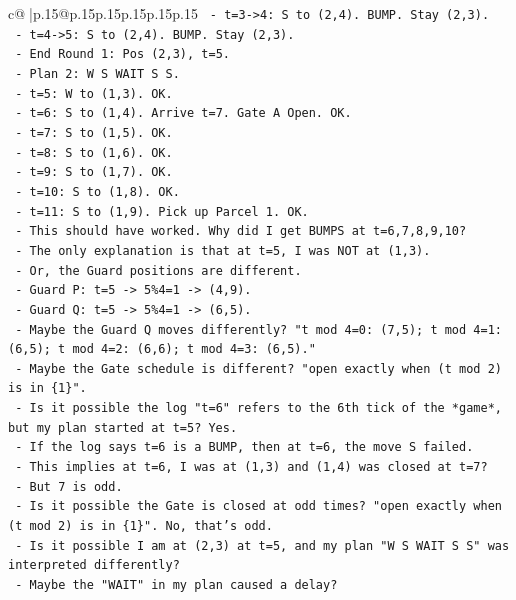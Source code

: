 \documentclass{article}
\begin{document}
{\begin{supertabular}{c@{$\;$}|p{.15\linewidth}@{}p{.15\linewidth}p{.15\linewidth}p{.15\linewidth}p{.15\linewidth}p{.15\linewidth}}
{{{\texttt{  {-} t=3{-}>4: S to (2,4). BUMP. Stay (2,3).} \\
\texttt{  {-} t=4{-}>5: S to (2,4). BUMP. Stay (2,3).} \\
\texttt{  {-} End Round 1: Pos (2,3), t=5.} \\
\texttt{  {-} Plan 2: W S WAIT S S.} \\
\texttt{  {-} t=5: W to (1,3). OK.} \\
\texttt{  {-} t=6: S to (1,4). Arrive t=7. Gate A Open. OK.} \\
\texttt{  {-} t=7: S to (1,5). OK.} \\
\texttt{  {-} t=8: S to (1,6). OK.} \\
\texttt{  {-} t=9: S to (1,7). OK.} \\
\texttt{  {-} t=10: S to (1,8). OK.} \\
\texttt{  {-} t=11: S to (1,9). Pick up Parcel 1. OK.} \\
\texttt{  {-} This should have worked. Why did I get BUMPS at t=6,7,8,9,10?} \\
\texttt{  {-} The only explanation is that at t=5, I was NOT at (1,3).} \\
\texttt{  {-} Or, the Guard positions are different.} \\
\texttt{  {-} Guard P: t=5 {-}> 5\%4=1 {-}> (4,9).} \\
\texttt{  {-} Guard Q: t=5 {-}> 5\%4=1 {-}> (6,5).} \\
\texttt{  {-} Maybe the Guard Q moves differently? "t mod 4=0: (7,5); t mod 4=1: (6,5); t mod 4=2: (6,6); t mod 4=3: (6,5)."} \\
\texttt{  {-} Maybe the Gate schedule is different? "open exactly when (t mod 2) is in \{1\}".} \\
\texttt{  {-} Is it possible the log "t=6" refers to the 6th tick of the *game*, but my plan started at t=5? Yes.} \\
\texttt{  {-} If the log says t=6 is a BUMP, then at t=6, the move S failed.} \\
\texttt{  {-} This implies at t=6, I was at (1,3) and (1,4) was closed at t=7?} \\
\texttt{  {-} But 7 is odd.} \\
\texttt{  {-} Is it possible the Gate is closed at odd times? "open exactly when (t mod 2) is in \{1\}". No, that's odd.} \\
\texttt{  {-} Is it possible I am at (2,3) at t=5, and my plan "W S WAIT S S" was interpreted differently?} \\
\texttt{  {-} Maybe the "WAIT" in my plan caused a delay?} \\
}}}
\end{supertabular}}
\end{document}
